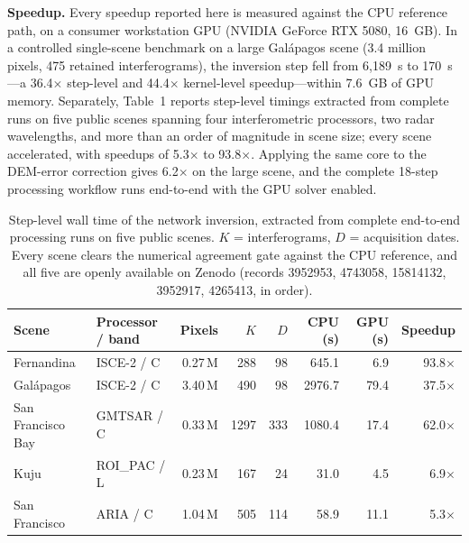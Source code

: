 \documentclass[a4paper]{article}
\begin{document}
\textbf{Speedup.}
Every speedup reported here is measured against the CPU reference path,
on a consumer workstation GPU (NVIDIA GeForce RTX 5080, 16~GB).
In a controlled single-scene benchmark on a large Gal\'apagos scene
(3.4 million pixels, 475 retained interferograms), the inversion step fell
from 6{,}189~s to 170~s---a 36.4$\times$ step-level
and 44.4$\times$ kernel-level speedup---within 7.6~GB of GPU memory.
Separately, Table~1 reports step-level timings extracted from complete runs
on five public scenes spanning four interferometric processors,
two radar wavelengths, and more than an order of magnitude in scene size;
every scene accelerated, with speedups of 5.3$\times$ to 93.8$\times$.
Applying the same core to the DEM-error correction gives 6.2$\times$
on the large scene, and the complete 18-step processing workflow
runs end-to-end with the GPU solver enabled.

\begin{table}[ht]
  \centering
  \caption{%
    Step-level wall time of the network inversion,
    extracted from complete end-to-end processing runs on five public scenes.
    $K$ = interferograms, $D$ = acquisition dates.
    Every scene clears the numerical agreement gate against the CPU reference,
    and all five are openly available on Zenodo
    (records 3952953, 4743058, 15814132, 3952917, 4265413, in order).}
  \small
  \begin{tabular}{llrrrrrr}
    \toprule
    Scene             & Processor / band & Pixels  & $K$  & $D$ & CPU (s) & GPU (s) & Speedup      \\
    \midrule
    Fernandina        & ISCE-2 / C       & 0.27\,M & 288  & 98  & 645.1   & 6.9     & 93.8$\times$ \\
    Gal\'apagos       & ISCE-2 / C       & 3.40\,M & 490  & 98  & 2976.7  & 79.4    & 37.5$\times$ \\
    San Francisco Bay & GMTSAR / C       & 0.33\,M & 1297 & 333 & 1080.4  & 17.4    & 62.0$\times$ \\
    Kuju              & ROI\_PAC / L     & 0.23\,M & 167  & 24  & 31.0    & 4.5     & 6.9$\times$  \\
    San Francisco     & ARIA / C         & 1.04\,M & 505  & 114 & 58.9    & 11.1    & 5.3$\times$  \\
    \bottomrule
  \end{tabular}
\end{table}
\end{document}
